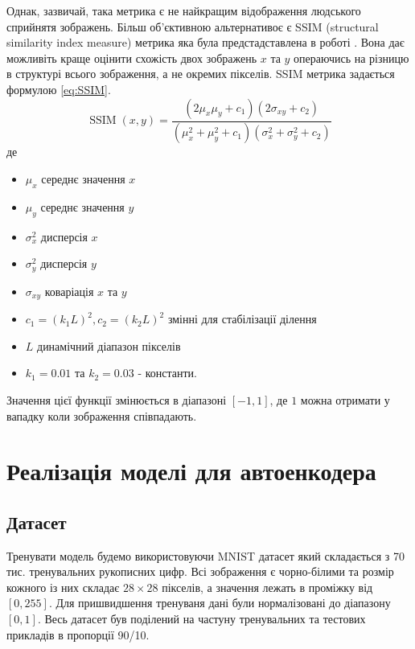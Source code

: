 \documentclass[14pt,a4paper]{extarticle}
\newcounter{e}
\numberwithin{equation}{section}
\numberwithin{figure}{section}
\begin{document}
	Однак, зазвичай, така метрика є не найкращим відображення людського сприйнятя зображень. Більш об'єктивною альтернативоє є SSIM (structural similarity index measure) метрика яка була предстадставлена в роботі \cite{1284395}. Вона дає можливіть краще оцінити схожість двох зображень $x$ та $y$ операючись на різницю в структурі всього зображення, а не окремих пікселів. SSIM метрика задається формулою \ref{eq:SSIM}.
	\begin{equation}
		\label{eq:SSIM}
		\operatorname{SSIM}(x, y)=\frac{\left(2 \mu_{x} \mu_{y}+c_{1}\right)\left(2 \sigma_{x 	y}+c_{2}\right)}{\left(\mu_{x}^{2}+\mu_{y}^{2}+c_{1}\right)\left(\sigma_{x}^{2}+\sigma_{y}^{2}+c_{2}\right)}
	\end{equation}
	де
	\begin{itemize}
		\item $\mu_{x}$ середнє значення $x$
		\item $\mu_{y}$ середнє значення $y$
		\item $\sigma_{x}^{2}$ дисперсія $x$
		\item $\sigma_{y}^{2}$ дисперсія  $y$
		\item $\sigma_{x y}$ коваріація $x$ та $y$
		\item $c_{1}=\left(k_{1} L\right)^{2}, c_{2}=\left(k_{2} L\right)^{2}$ змінні для стабілізації ділення
		\item $L$ динамічний діапазон пікселів
		\item $k_{1}=0.01$ та $k_{2}=0.03$ - константи.	
	\end{itemize}
	
	Значення цієї функції змінюється в діапазоні $[-1, 1]$, де $1$ можна отримати у вападку коли зображення співпадають.
	
	\newpage
	\thispagestyle{empty}
	\section{Реалізація моделі для автоенкодера}
	
	\subsection{Датасет}

	Тренувати модель будемо використовуючи MNIST датасет який складається з 70 тис. тренувальних рукописних цифр. Всі зображення є чорно-білими та розмір кожного із них складає $28 \times 28$ пікселів, а значення лежать в проміжку від $[0,255]$. Для пришвидшення тренуваня дані  були нормалізовані до діапазону $[0, 1]$. Весь датасет був поділений на частуну тренувальних та тестових прикладів в пропорції 90/10.
	
\end{document}
